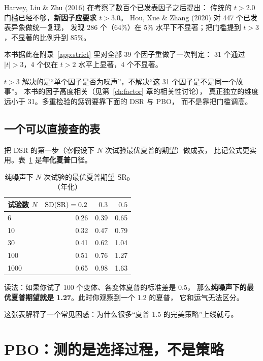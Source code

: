 Harvey, Liu \& Zhu (2016) 在考察了数百个已发表因子之后提出：
传统的 $t>2.0$ 门槛已经不够，\textbf{新因子应要求 $t>3.0$}。
Hou, Xue \& Zhang (2020) 对 447 个已发表异象做统一复现，
发现 286 个（64\%）在 5\% 水平下不显著；把门槛提到 $t>3$，不显著的比例升到 85\%。

本书据此在附录~\ref{app:strict} 里对全部 39 个因子重做了一次判定：
31 个通过 $|t|>3$，4 个仅在 $t>2$ 水平上显著，4 个不显著。

\begin{warnbox}[别把“通过 $t>3$”当成“独立发现”]
$t>3$ 解决的是“单个因子是否为噪声”，不解决“这 31 个因子是不是同一个故事”。
本书的因子高度相关（见第~\ref{ch:factor} 章的相关性讨论），
真正独立的维度远小于 31。多重检验的惩罚要靠下面的 DSR 与 PBO，
而不是靠把门槛调高。
\end{warnbox}

\subsection{一个可以直接查的表}

把 DSR 的第一步（零假设下 $N$ 次试验最优夏普的期望）做成表，
比记公式更实用。表~\ref{tab:sr0} 是\textbf{年化夏普}口径。

\begin{table}[htbp]
\centering
\caption{纯噪声下 $N$ 次试验的最优夏普期望 $\mathrm{SR}_0$（年化）}
\label{tab:sr0}
\small
\begin{tabular}{@{}lrrr@{}}
\toprule
试验数 $N$ & $\mathrm{SD}(\mathrm{SR})=0.2$ & $0.3$ & $0.5$ \\
\midrule
6   & 0.26 & 0.39 & 0.65 \\
10  & 0.32 & 0.47 & 0.79 \\
30  & 0.41 & 0.62 & 1.04 \\
100 & 0.51 & 0.76 & 1.27 \\
1000& 0.65 & 0.98 & 1.63 \\
\bottomrule
\end{tabular}
\end{table}

读法：如果你试了 100 个变体、各变体夏普的标准差是 0.5，
那么\textbf{纯噪声下的最优夏普期望就是 1.27}。此时你观察到一个 1.2 的夏普，
它和运气无法区分。

这张表解释了一个常见困惑：为什么很多“夏普 1.5 的完美策略”上线就亏。

\section{PBO：测的是选择过程，不是策略}

